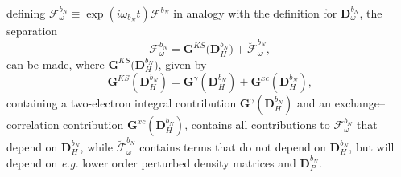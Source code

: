 \documentclass[%
 reprint,
 amsmath,amssymb,
 aps,
]{revtex4-1}
\begin{document}
defining $\bm{\mathcal{F}}^{b_{N}}_{\omega} \equiv \exp{\left(i \omega_{b_{N}}
t\right)}\bm{\mathcal{F}}^{b_{N}}$ in analogy with the definition for
$\mathbf{D}^{b_N}_{\omega}$, the separation
\begin{equation}\label{fbomega}
\bm{\mathcal{F}}^{b_{N}}_{\omega} = \mathbf{G}^{KS} \bigl( \mathbf{D}_{H}^{b_{N}} \bigr) +
\breve{\bm{\mathcal{F}}}^{b_{N}}_{\omega}\text{,}
\end{equation}
can be made, where $\mathbf{G}^{KS} \bigl( \mathbf{D}_{H}^{b_{N}} \bigr)$, given by
\begin{equation}\label{GKSbc}
\mathbf{G}^{KS}(\mathbf{D}^{b_{N}}_{H}) = \mathbf{G}^{\gamma}(\mathbf{D}^{b_{N}}_{H}) + \mathbf{G}^{xc}(\mathbf{D}^{b_{N}}_{H})\text{,}
\end{equation}
containing a two-electron integral contribution
$\mathbf{G}^{\gamma}(\mathbf{D}^{b_{N}}_{H})$ and an exchange--correlation
contribution $\mathbf{G}^{xc}(\mathbf{D}^{b_{N}}_{H})$, contains all
contributions to $\bm{\mathcal{F}}^{b_{N}}_{\omega} $ that depend on
$\mathbf{D}^{b_{N}}_{H}$, while $\breve{\bm{\mathcal{F}}}^{b_{N}}_{\omega}$
contains terms that do not depend on $\mathbf{D}^{b_{N}}_{H}$, but will depend
on \textit{e.g.} lower order perturbed density matrices and
$\mathbf{D}^{b_N}_P$. 
\end{document}
